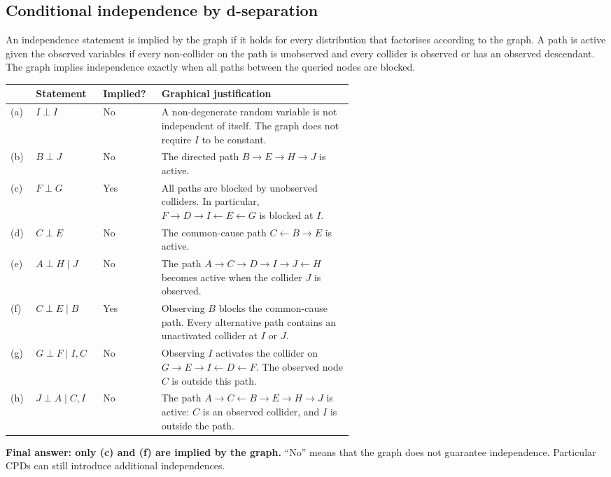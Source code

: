 
\subsection*{Conditional independence by d-separation}
An independence statement is implied by the graph if it holds for every
distribution that factorises according to the graph. A path is active given
the observed variables if every non-collider on the path is unobserved and
every collider is observed or has an observed descendant. The graph implies
independence exactly when all paths between the queried nodes are blocked.

\medskip
\noindent
\begin{tabular}{@{}lllp{0.57\linewidth}@{}}
\hline
 & Statement & Implied? & Graphical justification \\
\hline
(a) & $I\perp I$ & No &
A non-degenerate random variable is not independent of itself. The graph
does not require $I$ to be constant. \\[0.5em]
(b) & $B\perp J$ & No &
The directed path $B\to E\to H\to J$ is active. \\[0.5em]
(c) & $F\perp G$ & Yes &
All paths are blocked by unobserved colliders. In particular,
$F\to D\to I\leftarrow E\leftarrow G$ is blocked at $I$. \\[0.5em]
(d) & $C\perp E$ & No &
The common-cause path $C\leftarrow B\to E$ is active. \\[0.5em]
(e) & $A\perp H\mid J$ & No &
The path $A\to C\to D\to I\to J\leftarrow H$ becomes active
when the collider $J$ is observed. \\[0.5em]
(f) & $C\perp E\mid B$ & Yes &
Observing $B$ blocks the common-cause path. Every alternative path
contains an unactivated collider at $I$ or $J$. \\[0.5em]
(g) & $G\perp F\mid I,C$ & No &
Observing $I$ activates the collider on
$G\to E\to I\leftarrow D\leftarrow F$.
The observed node $C$ is outside this path. \\[0.5em]
(h) & $J\perp A\mid C,I$ & No &
The path $A\to C\leftarrow B\to E\to H\to J$ is active:
$C$ is an observed collider, and $I$ is outside the path. \\
\hline
\end{tabular}

\medskip
\noindent\textbf{Final answer: only (c) and (f) are implied by the graph.}
``No'' means that the graph does not guarantee independence. Particular CPDs
can still introduce additional independences.

